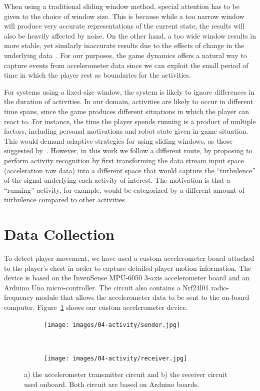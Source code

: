 When using a traditional sliding window method, special attention has to be given to the choice of window size. This is because while a too narrow window will produce very accurate representations of the current state, the results will also be heavily affected by noise. On the other hand, a too wide window results in more stable, yet similarly inaccurate results due to the effects of change in the underlying data~\citep{bifet_learning_2007}. For our purposes, the game dynamics offers a natural way to capture events from accelerometer data since we can exploit the small period of time in which the player rest as boundaries for the activities. 

For systems using a fixed-size window, the system is likely to ignore differences in the duration of activities. In our domain, activities are likely to occur in different time spans, since the game produces different situations in which the player can react to. For instance, the time the player spends running is a product of multiple factors, including personal motivations and robot state given in-game situation. This would demand adaptive strategies for using sliding windows, as those suggested by~\cite{noor_adaptive_2016}. However, in this work we follow a different route, by proposing to perform activity recognition by first transforming the data stream input space (acceleration raw data) into a different space that would capture the ``turbulence'' of the signal underlying each activity of interest. The motivation is that a ``running'' activity, for example, would be categorized by a different amount of turbulence compared to other activities.

\section{Data Collection}\label{sec:data_collection}

To detect player movement, we have used a custom accelerometer board attached to the player's chest in order to capture detailed player motion information. The device is based on the InvenSense MPU-6050 3-axis accelerometer board and an Arduino Uno micro-controller. The circuit also contains a Nrf24l01 radio-frequency module that allows the accelerometer data to be sent to the on-board computer. Figure~\ref{fig:the_accelerometer} shows our custom accelerometer device.

\begin{figure}[H]
      \centering
      \begin{subfigure}[t]{0.5\textwidth}
      	\centering
	    \texttt{[image: images/04-activity/sender.jpg]}
	    \caption{}
	  \end{subfigure}
	  ~
	  \begin{subfigure}[t]{0.5\textwidth}
      	\centering
	    \texttt{[image: images/04-activity/receiver.jpg]}
	    \caption{}
	  \end{subfigure}
      \caption{a) the accelerometer transmitter circuit and b) the receiver circuit used onboard. Both circuit are based on Arduino boards.}\label{fig:the_accelerometer}
\end{figure}

